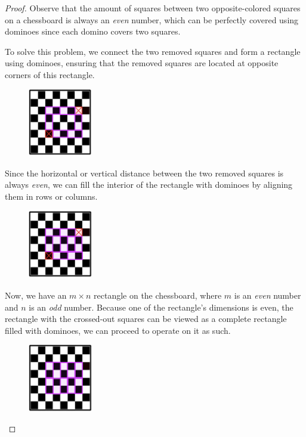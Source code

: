 \documentclass{article}
\begin{document}
\begin{proof} Observe that the amount of squares between two opposite-colored squares on a chessboard is always an \textit{even} number, which can be perfectly covered using dominoes since each domino covers two squares.

To solve this problem, we connect the two removed squares and form a rectangle using dominoes, ensuring that the removed squares are located at opposite corners of this rectangle.

\begin{figure}[htbp] \centering \includegraphics[width=0.25\textwidth]{images/1.5.1.jpg}
\end{figure}

Since the horizontal or vertical distance between the two removed squares is always \textit{even}, we can fill the interior of the rectangle with dominoes by aligning them in rows or columns.

\begin{figure}[htbp] \centering \includegraphics[width=0.25\textwidth]{images/1.5.2.jpg} %
\end{figure}

\newpage

Now, we have an $m \times n$ rectangle on the chessboard, where $m$ is an \textit{even} number and $n$ is an \textit{odd} number. Because one of the rectangle’s dimensions is even, the rectangle with the crossed-out squares can be viewed as a complete rectangle filled with dominoes, we can proceed to operate on it as such.

\begin{figure}[htbp] \centering \includegraphics[width=0.25\textwidth]{images/1.5.3.jpg} %
\end{figure}


\end{proof}
\end{document}
